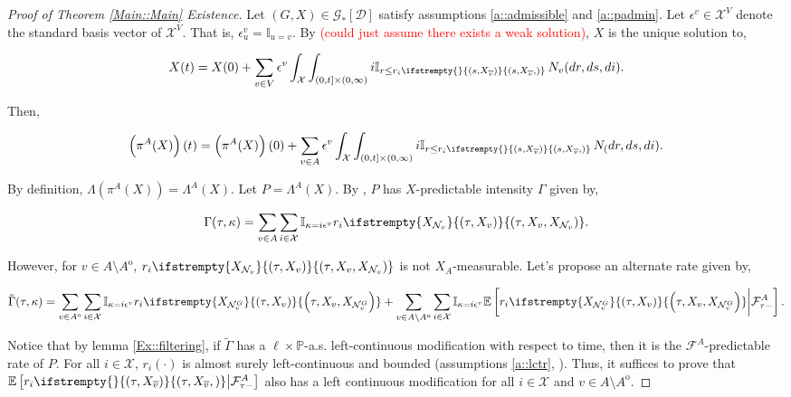 \documentclass[12pt]{article}
\newcommand{\mb}{\mathbb}
\newcommand{\mc}{\mathcal}
\newcommand{\ov}{\overline}
\newcommand{\ep}{\epsilon}
\newcommand{\tr}{\textcolor{red}}
\newcommand{\pr}{\mb{P}}							%
\newcommand{\ex}[1]{\mb{E}\left[#1\right]}			%
\newcommand{\cad}{\mc{D}}							%
\newcommand{\sta}{\mc{X}}							%
\newcommand{\neigh}[1]{\mc{N}_{#1}}				%
\newcommand{\gneigh}[2]{\mc{N}^{#1}_{#2}}			%
\newcommand{\cl}[1]{\ov{#1}}						%
\newcommand{\Xf}{X}									%
\newcommand{\poiss}{N}								%
\newcommand{\Sm}{\ell}								%
\newcommand{\rate}{r}								%
\newcommand{\F}{\mc{F}}								%
\newcommand{\proj}{\pi}								%
\newcommand{\poissv}[1]{_{#1}}						%
\newcommand{\vind}[1]{_{#1}}						%
\newcommand{\tme}[1]{(#1)}							%
\newcommand{\vpara}[1]{^{#1}}						%
\newcommand{\stpara}[1]{_{#1}}						%
\newcommand{\tpara}[1]{_{#1}}						%
\newcommand{\Gs}{\mc{G}_\ast}						%
\newcommand{\tmepro}[3]{
\ifstrempty{#3}{
	\left(#1,#2\right)}{
	\left(#1,#2,#3\right)}}							%
\renewcommand{\sp}[1]{[#1]}							%
\newcommand{\inte}[1]{{#1}^\mathrm{o}}				%
\newcommand{\alt}[1]{\tilde{#1}}					%
\newcommand{\pmap}{\Lambda}							%
\newcommand{\rt}{\tau}								%
\renewcommand{\mark}{\kappa}						%
\newcommand{\ratee}{\Gamma}							%
\newcommand{\cratee}{\alt{\ratee}}					%
\newcommand{\rp}{P}									%
\newcommand{\ev}[1]{\ep^{#1}}						%
\begin{document}
\begin{proof}[Proof of Theorem \ref{Main::Main} Existence]

Let \((G,\Xf) \in \Gs\sp{\cad}\) satisfy assumptions \ref{a::admissible} and \ref{a::padmin}. Let \(\ev{v} \in \sta^V\) denote the standard basis vector of \(\sta^V\). That is, \(\ev{v}\vind{u} = \mb{I}_{u=v}\). By \cite[theorem \ref{F-wp::wp}]{F} \tr{(could just assume there exists a weak solution)}, \(\Xf\) is the unique solution to,

\[\Xf\tme{t} = \Xf\tme{0} + \sum_{v \in V}\ev{v}\int_\sta\int_{(0,t]\times (0,\infty)} i\mb{I}_{r \leq \rate\stpara{i}\tmepro{s}{\Xf\vind{\cl{v}}}{}}\,\poiss\poissv{v}(dr,ds,di).\]

Then,

\[\left(\proj\vpara{A}(\Xf)\right)\tme{t} = \left(\proj\vpara{A}(\Xf)\right)\tme{0} + \sum_{v\in A}\ev{v}\int_\sta\int_{(0,t]\times (0,\infty)} i\mb{I}_{r \leq \rate\stpara{i}\tmepro{s}{\Xf\vind{\cl{v}}}{}}\,\poiss\poissv(dr,ds,di).\]

By definition, \(\pmap\left(\proj\vpara{A}(\Xf)\right) = \pmap\vpara{A}(\Xf)\). Let \(\rp = \pmap\vpara{A}(\Xf)\). By \cite[Exercise 14.7.1]{DalVer08}, \(\rp\) has \(\Xf\)-predictable intensity \(\ratee\) given by,

\[\ratee(\rt,\mark) = \sum_{v \in A} \sum_{i \in \sta} \mb{I}_{\mark = i\ev{v}} \rate\stpara{i}\tmepro{\rt}{\Xf\vind{v}}{\Xf\vind{\neigh{v}}}.\]

However, for \(v \in A\setminus \inte{A}\), \(\rate\stpara{i}\tmepro{\rt}{\Xf\vind{v}}{\Xf\vind{\neigh{v}}}\) is not \(\Xf\vind{A}\)-measurable. Let's propose an alternate rate given by,

\begin{equation}
\cratee(\rt,\mark) = \sum_{v \in \inte{A}}\sum_{i\in \sta} \mb{I}_{\mark = i\ev{v}}\rate\stpara{i}\tmepro{\rt}{\Xf\vind{v}}{\Xf\vind{\gneigh{G}{v}}} + \sum_{v \in A\setminus \inte{A}}\sum_{i \in \sta} \mb{I}_{\mark = i\ev{v}}\ex{\rate\stpara{i}\tmepro{\rt}{\Xf\vind{v}}{\Xf\vind{\gneigh{G}{v}}}\middle|\F\vpara{A}\tpara{\rt-}}.
\label{Ex::tempfiltrate}
\end{equation}

Notice that by lemma \ref{Ex::filtering}, if \(\alt{\ratee}\) has a \(\Sm\times \pr\)-a.s. left-continuous modification with respect to time, then it is the \(\F\vpara{A}\)-predictable rate of \(\rp\). For all \(i\in\sta\), \(\rate\stpara{i}\tme{\cdot}\) is almost surely left-continuous and bounded (assumptions \ref{a::lctr}, \cite[\ref{F-a::bddr}]{F}). Thus, it suffices to prove that \(\ex{\rate\stpara{i}\tmepro{\rt}{\Xf\vind{\cl{v}}}{}\middle|\F\vpara{A}\tpara{\rt-}}\) also has a left continuous modification for all \(i\in \sta\) and \(v \in A\setminus\inte{A}\).


\end{proof}
\end{document}
